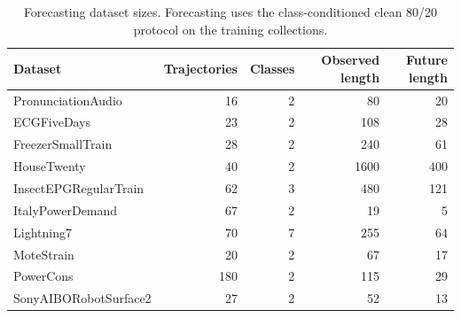 \documentclass[11pt]{article}
\begin{document}
\begin{table}[H]
\centering
\caption{Classification dataset sizes and lengths. Variable-length Parkinson settings report minimum and maximum lengths.}
\label{tab:data}
\small
{}
\end{table}

\begin{table}[H]
\centering
\caption{Forecasting dataset sizes. Forecasting uses the class-conditioned clean 80/20 protocol on the training collections.}
\label{tab:forecast-data}
\small
\begin{tabular}{lrrrr}
\toprule
Dataset & Trajectories & Classes & Observed length & Future length \\
\midrule
PronunciationAudio        & 16  & 2 & 80   & 20 \\
ECGFiveDays               & 23  & 2 & 108  & 28 \\
FreezerSmallTrain         & 28  & 2 & 240  & 61 \\
HouseTwenty               & 40  & 2 & 1600 & 400 \\
InsectEPGRegularTrain     & 62  & 3 & 480  & 121 \\
ItalyPowerDemand          & 67  & 2 & 19   & 5 \\
Lightning7                & 70  & 7 & 255  & 64 \\
MoteStrain                & 20  & 2 & 67   & 17 \\
PowerCons                 & 180 & 2 & 115  & 29 \\
SonyAIBORobotSurface2     & 27  & 2 & 52   & 13 \\
\bottomrule
\end{tabular}
\end{table}
\end{document}
